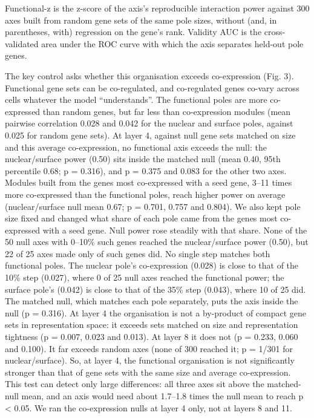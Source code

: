 \documentclass[
  11pt,
]{article}
\newcounter{none} %
\begin{document}
Functional-z is the z-score of the axis's reproducible interaction power
against 300 axes built from random gene sets of the same pole sizes,
without (and, in parentheses, with) regression on the gene's rank.
Validity AUC is the cross-validated area under the ROC curve with which
the axis separates held-out pole genes.

The key control asks whether this organisation exceeds co-expression
(Fig. 3). Functional gene sets can be co-regulated, and co-regulated
genes co-vary across cells whatever the model ``understands''. The
functional poles are more co-expressed than random genes, but far less
than co-expression modules (mean pairwise correlation 0.028 and 0.042
for the nuclear and surface poles, against 0.025 for random gene sets).
At layer 4, against null gene sets matched on size and this average
co-expression, no functional axis exceeds the null: the nuclear/surface
power (0.50) sits inside the matched null (mean 0.40, 95th percentile
0.68; p = 0.316), and p = 0.375 and 0.083 for the other two axes.
Modules built from the genes most co-expressed with a seed gene, 3--11
times more co-expressed than the functional poles, reach higher power on
average (nuclear/surface null mean 0.67; p = 0.701, 0.757 and 0.804). We
also kept pole size fixed and changed what share of each pole came from
the genes most co-expressed with a seed gene. Null power rose steadily
with that share. None of the 50 null axes with 0--10\% such genes
reached the nuclear/surface power (0.50), but 22 of 25 axes made only of
such genes did. No single step matches both functional poles. The
nuclear pole's co-expression (0.028) is close to that of the 10\% step
(0.027), where 0 of 25 null axes reached the functional power; the
surface pole's (0.042) is close to that of the 35\% step (0.043), where
10 of 25 did. The matched null, which matches each pole separately, puts
the axis inside the null (p = 0.316). At layer 4 the organisation is not
a by-product of compact gene sets in representation space: it exceeds
sets matched on size and representation tightness (p = 0.007, 0.023 and
0.013). At layer 8 it does not (p = 0.233, 0.060 and 0.100). It far
exceeds random axes (none of 300 reached it; p = 1/301 for
nuclear/surface). So, at layer 4, the functional organisation is not
significantly stronger than that of gene sets with the same size and
average co-expression. This test can detect only large differences: all
three axes sit above the matched-null mean, and an axis would need about
1.7--1.8 times the null mean to reach p \textless{} 0.05. We ran the
co-expression nulls at layer 4 only, not at layers 8 and 11.
\end{document}

